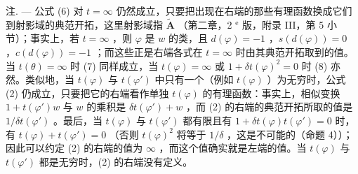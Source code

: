 注. --- 公式 (6) 对 \(t = \infty\) 仍然成立，只要把出现在右端的那些有理函数换成它们到射影域的典范开拓，这里射影域指 \(\tilde{\mathbf{A}}\) （第二章，2 \(^{\text{e}}\) 版，附录 III，第 5 小节）；事实上，若 \(t = \infty\) ，则 \(\varphi\) 是 \(w\) 的类，且 \(d(\varphi) = -1\) ，\(s(d(\varphi)) = 0\) ，\(c(d(\varphi)) = -1\) ；而这些正是右端各式在 \(t = \infty\) 时由其典范开拓取到的值。当 \(t(\theta) = \infty\) 时 (7) 同样成立，当 \(t(\varphi) = \infty\) 或 \(1 + \delta t(\varphi)^{2} = 0\) 时 (8) 亦然。类似地，当 \(t(\varphi)\) 与 \(t(\varphi')\) 中只有一个（例如 \(t(\varphi)\) ）为无穷时，公式 (2) 仍成立，只要把它的右端看作单独 \(t(\varphi)\) 的有理函数：事实上，相似变换 \(1 + t(\varphi')w\) 与 \(w\) 的乘积是 \(\delta t(\varphi') + w\) ，而 (2) 的右端的典范开拓所取的值是 \(1/\delta t(\varphi')\) 。最后，当 \(t(\varphi)\) 与 \(t(\varphi')\) 都有限且有 \(1 + \delta t(\varphi)t(\varphi') = 0\) 时，有 \(t(\varphi) + t(\varphi') = 0\) （否则 \(t(\varphi)^{2}\) 将等于 \(1/\delta\) ，这是不可能的（命题 4））；因此可以约定 (2) 的右端的值为 \(\infty\) ，而这个值确实就是左端的值。当 \(t(\varphi)\) 与 \(t(\varphi')\) 都是无穷时，(2) 的右端没有定义。

